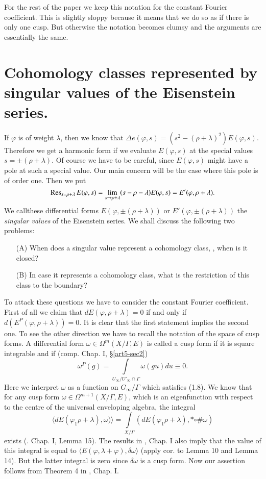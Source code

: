For the rest of the paper we keep this notation for the constant Fourier coefficient. This is slightly sloppy because it means that we do so as if there is only one cusp. But otherwise the notation becomes clumsy and the arguments are essentially the same.

\section{Cohomology classes represented by singular values of the Eisenstein series.}\label{art5-sec4}
If $\varphi$ is of weight $\lambda$, then we know that $\Delta e(\varphi, s) = (s^2 - (\rho + \lambda)^2) E (\varphi, s)$. Therefore we get a harmonic form if we evaluate $E(\varphi,s)$ at the special values $s = \pm (\rho + \lambda)$. Of course we have to be careful, since $E(\varphi, s)$ might have a pole at such a special value. Our main concern will be the case where this pole is of order one. Then we put
$$
\operatorname{Res}_{s = \rho + \lambda} E(\varphi, s) = \lim\limits_{s \to \rho + \lambda} (s - \rho - \lambda) E (\varphi, s) = E' (\varphi, \rho + \lambda).
$$
We call\pageoriginale these differential forms $E (\varphi , \pm  (\rho +\lambda))$ or $E' (\varphi, \pm (\rho + \lambda))$ the \textit{singular values} of the Eisenstein series. We shall discuss the following two problems:
\begin{itemize}
\item[(A)] When does a singular value represent a cohomology class, \ie, when is it closed?

\item[(B)] In case it represents a cohomology class, what is the restriction of this class to the boundary?
\end{itemize}
To attack these questions we have to consider the constant Fourier coefficient. First of all we claim that $d E (\varphi, \rho+\lambda) = 0$ if and only if $d (E^P (\varphi, \rho + \lambda)) =0$. It is clear that the first statement implies the second one. To see the other direction we have to recall the notation of the space of cusp forms. A differential form $\omega\in \Omega^m (X/\Gamma, E)$ is called a cusp form if it is square integrable and if (comp. \cite{art5-key8} Chap. I, \S \ref{art5-sec2})
$$
\omega^P (g) = \int\limits_{U_\infty/ U'_\infty \cap \Gamma} \omega (gu) du \equiv 0.
$$
Here we interpret $\omega$ as a function on $G_\infty / \Gamma$ which satisfies (1.8). We know that for any cusp form $\omega \in \Omega^{m+1} (X/ \Gamma, E)$, which is an eigenfunction with respect to the centre of the universal enveloping algebra, the integral
$$
\langle dE (\varphi_1 \rho + \lambda),\omega)\rangle = \int\limits_{X/\Gamma} (dE (\varphi_1 \rho + \lambda), \ast \overline{\circ \# \omega})
$$
exists (\cite{art5-key8}. Chap. I, Lemma 15). The results in \cite{art5-key8}, Chap. I also imply that the value of this integral is equal to $\langle E(\varphi, \lambda + \varphi), \delta \omega \rangle$ (apply cor. to Lemma 10 and Lemma 14). But the latter integral is zero since $\delta \omega$ is a cusp form. Now our assertion follows from Theorem 4 in \cite{art5-key8}, Chap. I.

